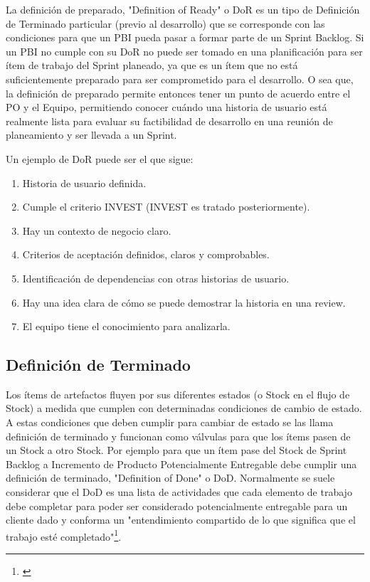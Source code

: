 La definición de preparado, "Definition of Ready" o DoR es un tipo de Definición de Terminado particular (previo al desarrollo) que se corresponde con las condiciones para que un PBI pueda pasar a formar parte de un Sprint Backlog. Si un PBI no cumple con su DoR no puede ser tomado en una planificación para ser ítem de trabajo del Sprint planeado, ya que es un ítem que no está suficientemente preparado para ser comprometido para el desarrollo. O sea que, la definición de preparado permite entonces tener un punto de acuerdo entre el PO y el Equipo, permitiendo conocer cuándo una historia de usuario está realmente lista para evaluar su factibilidad de desarrollo en una reunión de planeamiento y ser llevada a un Sprint.

Un ejemplo de DoR puede ser el que sigue:

\begin{enumerate}
\item{Historia de usuario definida.}
\item{Cumple el criterio INVEST (INVEST es tratado posteriormente).}
\item{Hay un contexto de negocio claro.}
\item{Criterios de aceptación definidos, claros y comprobables.}
\item{Identificación de dependencias con otras historias de usuario.}
\item{Hay una idea clara de cómo se puede demostrar la historia en una review.}
\item{El equipo tiene el conocimiento para analizarla.}
\end{enumerate}

\subsection{Definición de Terminado}

Los ítems de artefactos fluyen por sus diferentes estados (o Stock en el flujo de Stock) a medida que cumplen con determinadas condiciones de cambio de estado. A estas condiciones que deben cumplir para cambiar de estado se las llama definición de terminado y funcionan como válvulas para que los ítems pasen de un Stock a otro Stock. Por ejemplo para que un ítem pase del Stock de Sprint Backlog a Incremento de Producto Potencialmente Entregable debe cumplir una definición de terminado, "Definition of Done" o DoD. Normalmente se suele considerar que el DoD es una lista de actividades que cada elemento de trabajo debe completar para poder ser considerado potencialmente entregable para un cliente dado y conforma un "entendimiento compartido de lo que significa que el trabajo esté completado"\footnote{\cite{Ken-Jeff-2013}}.

